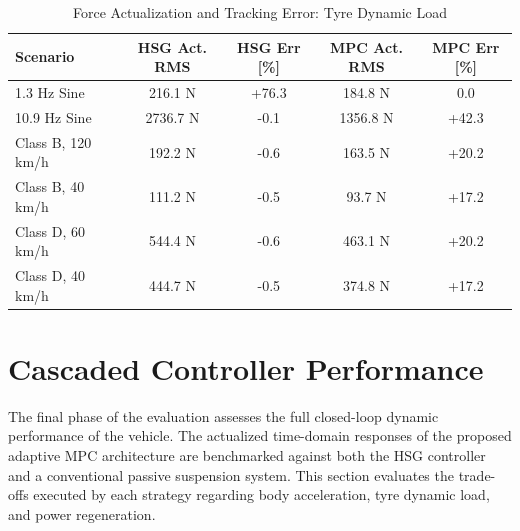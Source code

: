\begin{table}[H]
    \centering
    \caption{Force Actualization and Tracking Error: Tyre Dynamic Load}
    \label{tab:act_rh_metrics}
    \renewcommand{\arraystretch}{1.2}
    \begin{tabular}{lcccc}
        \toprule
        \textbf{Scenario} & \textbf{HSG Act. RMS} & \textbf{HSG Err [\%]} & \textbf{MPC Act. RMS} & \textbf{MPC Err [\%]} \\
        \midrule
        1.3 Hz Sine      & 216.1 N & +76.3 & 184.8 N & \phantom{-}0.0 \\
        10.9 Hz Sine     & 2736.7 N& -0.1  & 1356.8 N& +42.3 \\
        Class B, 120 km/h& 192.2 N & -0.6  & 163.5 N & +20.2 \\
        Class B, 40 km/h & 111.2 N & -0.5  & 93.7 N  & +17.2 \\
        Class D, 60 km/h & 544.4 N & -0.6  & 463.1 N & +20.2 \\
        Class D, 40 km/h & 444.7 N & -0.5  & 374.8 N & +17.2 \\
        \bottomrule
    \end{tabular}
\end{table}

\section{Cascaded Controller Performance}
The final phase of the evaluation assesses the full closed-loop dynamic performance of the vehicle. The actualized time-domain responses of the proposed adaptive MPC architecture are benchmarked against both the HSG controller and a conventional passive suspension system. This section evaluates the trade-offs executed by each strategy regarding body acceleration, tyre dynamic load, and power regeneration.

